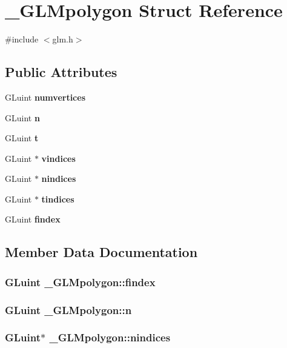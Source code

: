 \section{\-\_\-\-G\-L\-Mpolygon Struct Reference}
\label{struct___g_l_mpolygon}


{\ttfamily \#include $<$glm.\-h$>$}

\subsection*{Public Attributes}
\begin{DoxyCompactItemize}
\item 
G\-Luint {\bf numvertices}
\item 
G\-Luint {\bf n}
\item 
G\-Luint {\bf t}
\item 
G\-Luint $\ast$ {\bf vindices}
\item 
G\-Luint $\ast$ {\bf nindices}
\item 
G\-Luint $\ast$ {\bf tindices}
\item 
G\-Luint {\bf findex}
\end{DoxyCompactItemize}


\subsection{Member Data Documentation}
\subsubsection[{findex}]{\setlength{\rightskip}{0pt plus 5cm}G\-Luint \-\_\-\-G\-L\-Mpolygon\-::findex}\label{struct___g_l_mpolygon_a1693c3c286d0f917e7f4265dffeca944}
\subsubsection[{n}]{\setlength{\rightskip}{0pt plus 5cm}G\-Luint \-\_\-\-G\-L\-Mpolygon\-::n}\label{struct___g_l_mpolygon_aec909c5c529f61b642a31034d0b435b4}
\subsubsection[{nindices}]{\setlength{\rightskip}{0pt plus 5cm}G\-Luint$\ast$ \-\_\-\-G\-L\-Mpolygon\-::nindices}\label{struct___g_l_mpolygon_a01b669800e5c07054222e10808184e35}
